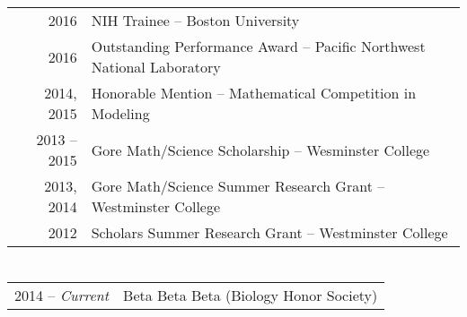 \documentclass[a4paper,10pt]{article}
\begin{document}
\section{\color{linkcolour}{Awards and Accolades}}
\begin{tabular}{rl}
2016 & NIH Trainee -- Boston University \\
2016 & Outstanding Performance Award -- Pacific Northwest National Laboratory
\\ 2014, 2015 & Honorable Mention -- Mathematical Competition in Modeling
\\ 2013 -- 2015&  Gore Math/Science Scholarship -- Wesminster College
\\ 2013, 2014& Gore Math/Science Summer Research Grant -- Westminster College
\\ 2012 & Scholars Summer Research Grant -- Westminster College
\end{tabular}

\section{\color{linkcolour}{Professional Affiliations}}
\begin{tabular}{rl}
2014 -- \emph{Current} & Beta Beta Beta (Biology Honor Society) \\
\end{tabular}
\end{document}
